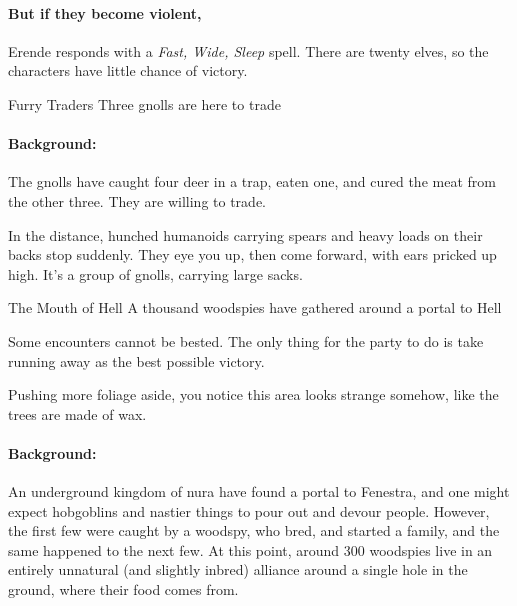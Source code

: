 \begin{multicols}{2}
\paragraph{But if they become violent,}
Erende responds with a \textit{Fast, Wide, Sleep} spell.
There are twenty elves, so the characters have little chance of victory.

{Furry Traders}%
{Three gnolls are here to trade}%

\paragraph{Background:}
The gnolls have caught four deer in a trap, eaten one, and cured the meat from the other three.  They are willing to trade.

\begin{boxtext}

  In the distance, hunched humanoids carrying spears and heavy loads on their backs stop suddenly.
  They eye you up, then come forward, with ears pricked up high.
  It's a group of gnolls, carrying large sacks.

\end{boxtext}


{\N The Mouth of Hell}%
{A thousand woodspies have gathered around a portal to Hell}%

Some encounters cannot be bested. The only thing for the party to do is take running away as the best possible victory.

\begin{boxtext}

  Pushing more foliage aside, you notice this area looks strange somehow, like the trees are made of wax.

\end{boxtext}

\paragraph{Background:}
An underground kingdom of nura have found a portal to Fenestra, and one might expect hobgoblins and nastier things to pour out and devour people.
However, the first few were caught by a woodspy, who bred, and started a family, and the same happened to the next few.
At this point, around 300 woodspies live in an entirely unnatural (and slightly inbred) alliance around a single hole in the ground, where their food comes from.


\end{multicols}
